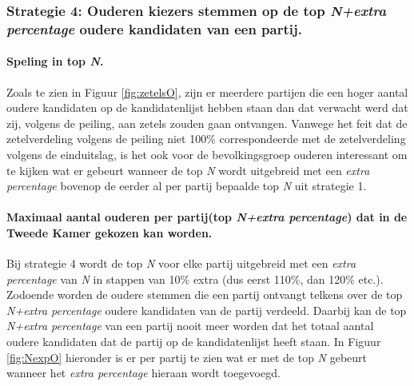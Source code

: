 \subsubsection{Strategie 4: Ouderen kiezers stemmen op de top \textit{N+extra percentage} oudere kandidaten van een partij.}

\paragraph{Speling in top \textit{N}.}
Zoals te zien in Figuur \ref{fig:zetelsO}, zijn er meerdere partijen die een hoger aantal oudere kandidaten op de kandidatenlijst hebben staan dan dat verwacht werd dat zij, volgens de peiling, aan zetels zouden gaan ontvangen. Vanwege het feit dat de zetelverdeling volgens de peiling niet 100\% correspondeerde met de zetelverdeling volgens de einduitslag, is het ook voor de bevolkingsgroep ouderen interessant om te kijken wat er gebeurt wanneer de top \textit{N} wordt uitgebreid met een \textit{extra percentage} bovenop de eerder al per partij bepaalde top \textit{N} uit strategie 1.



\paragraph{Maximaal aantal ouderen per partij(top \textit{N+extra percentage}) dat in de Tweede Kamer gekozen kan worden.} 
Bij strategie 4 wordt de top \textit{N} voor elke partij uitgebreid met een \textit{extra percentage} van \textit{N} in stappen van 10\% extra (dus eerst 110\%, dan 120\% etc.). Zodoende worden de oudere stemmen die een partij ontvangt telkens over de top \textit{N+extra percentage} oudere kandidaten van de partij verdeeld. Daarbij kan de top \textit{N+extra percentage} van een partij nooit meer worden dat het totaal aantal oudere kandidaten dat de partij op de kandidatenlijst heeft staan. In Figuur \ref{fig:NexpO} hieronder is er per partij te zien wat er met de top \textit{N} gebeurt wanneer het \textit{extra percentage} hieraan wordt toegevoegd.  


